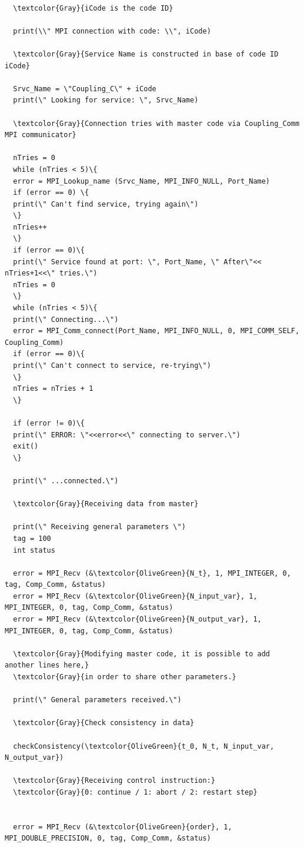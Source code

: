 \begin{Verbatim}[frame=single,commandchars=\\\{\}]

  \textcolor{Gray}{iCode is the code ID}

  print(\\" MPI connection with code: \\", iCode)

  \textcolor{Gray}{Service Name is constructed in base of code ID iCode}

  Srvc_Name = \"Coupling_C\" + iCode
  print(\" Looking for service: \", Srvc_Name)

  \textcolor{Gray}{Connection tries with master code via Coupling_Comm MPI communicator}

  nTries = 0
  while (nTries < 5)\{
  error = MPI_Lookup_name (Srvc_Name, MPI_INFO_NULL, Port_Name)
  if (error == 0) \{
  print(\" Can't find service, trying again\")
  \}
  nTries++
  \}
  if (error == 0)\{
  print(\" Service found at port: \", Port_Name, \" After\"<< nTries+1<<\" tries.\")
  nTries = 0
  \}
  while (nTries < 5)\{
  print(\" Connecting...\")
  error = MPI_Comm_connect(Port_Name, MPI_INFO_NULL, 0, MPI_COMM_SELF, Coupling_Comm)
  if (error == 0)\{
  print(\" Can't connect to service, re-trying\")
  \}
  nTries = nTries + 1
  \}

  if (error != 0)\{
  print(\" ERROR: \"<<error<<\" connecting to server.\")
  exit()
  \}

  print(\" ...connected.\")

  \textcolor{Gray}{Receiving data from master}

  print(\" Receiving general parameters \")
  tag = 100
  int status

  error = MPI_Recv (&\textcolor{OliveGreen}{N_t}, 1, MPI_INTEGER, 0, tag, Comp_Comm, &status)
  error = MPI_Recv (&\textcolor{OliveGreen}{N_input_var}, 1, MPI_INTEGER, 0, tag, Comp_Comm, &status)
  error = MPI_Recv (&\textcolor{OliveGreen}{N_output_var}, 1, MPI_INTEGER, 0, tag, Comp_Comm, &status)

  \textcolor{Gray}{Modifying master code, it is possible to add another lines here,}
  \textcolor{Gray}{in order to share other parameters.}

  print(\" General parameters received.\")

  \textcolor{Gray}{Check consistency in data}

  checkConsistency(\textcolor{OliveGreen}{t_0, N_t, N_input_var, N_output_var})

  \textcolor{Gray}{Receiving control instruction:}
  \textcolor{Gray}{0: continue / 1: abort / 2: restart step}


  error = MPI_Recv (&\textcolor{OliveGreen}{order}, 1, MPI_DOUBLE_PRECISION, 0, tag, Comp_Comm, &status)

\end{Verbatim}



